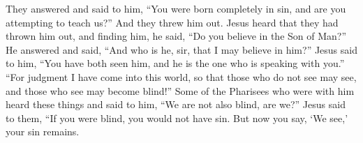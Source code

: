 \begin{biblechapter}
\verse They answered and said to him, “You were born completely in sin, and are you attempting to teach us?” And they threw him out.
 Jesus heard that they had thrown him out, and finding him, he said, “Do you believe in the Son of Man?”
\verse He answered and said, “And who is he, sir, that I may believe in him?”
\verse Jesus said to him, “You have both seen him, and he is the one who is speaking with you.”
\verse {} “For judgment I have come into this world, so that those who do not see may see, and those who see may become blind!”
\verse Some of the Pharisees who were with him heard these things and said to him, “We are not also blind, are we?”
\verse Jesus said to them, “If you were blind, you would not have sin. But now you say, ‘We see,’ your sin remains.
\end{biblechapter}

